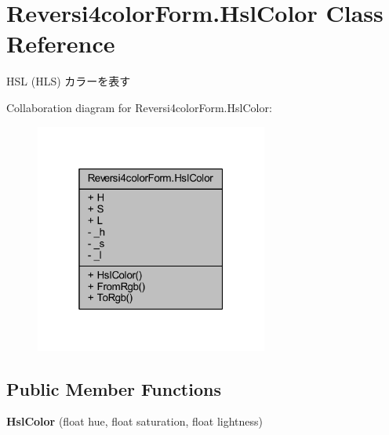 \hypertarget{class_reversi4color_form_1_1_hsl_color}{}\section{Reversi4color\+Form.\+Hsl\+Color Class Reference}
\label{class_reversi4color_form_1_1_hsl_color}


H\+SL (H\+LS) カラーを表す  




Collaboration diagram for Reversi4color\+Form.\+Hsl\+Color\+:
\nopagebreak
\begin{figure}[H]
\begin{center}
\leavevmode
\includegraphics[width=217pt]{class_reversi4color_form_1_1_hsl_color__coll__graph}
\end{center}
\end{figure}
\subsection*{Public Member Functions}
\begin{DoxyCompactItemize}
\item 
\mbox{\label{class_reversi4color_form_1_1_hsl_color_ad1bdb3fb711f7a0c5306ca92b3c189a3}} 
{\bfseries Hsl\+Color} (float hue, float saturation, float lightness)
\end{DoxyCompactItemize}
